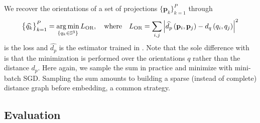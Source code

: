 We recover the orientations of a set of projections $\big\{ \mathbf{p}_k \big\}_{k=1}^P$ through
\begin{equation}
    \big\{ \widehat{q_k} \big\}_{k=1}^P = \operatorname*{arg\,min}_{\{q_k \in \mathbb{S}^3\}} L_\text{OR},
    \quad \text{where} \quad
    L_\text{OR} = \sum_{i,j} \left| \widehat{d_p} \left( \mathbf{p}_i, \mathbf{p}_j \right) - d_q\left(q_i,q_j\right) \right|^2
    \label{eqn:orientation-recovery}
\end{equation}
is the loss and $\widehat{d_p}$ is the estimator trained in .
Note that the sole difference with~ is that the minimization is performed over the orientations $q$ rather than the distance $d_p$.
Here again, we sample the sum in practice and minimize  with mini-batch SGD.
Sampling the sum amounts to building a sparse (instead of complete) distance graph before embedding, a common strategy.

\subsection{Evaluation}\label{sec:method:evaluation}


